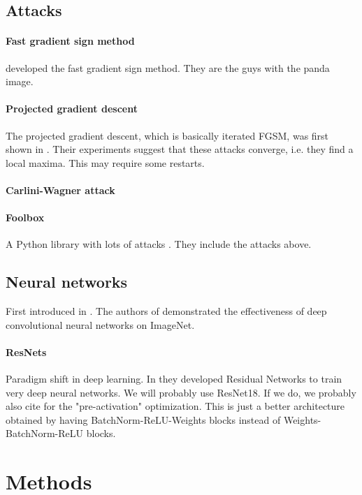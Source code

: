 \documentclass{article}
\begin{document}
\subsection{Attacks}

\paragraph{Fast gradient sign method}
\cite{goodfellow2014explaining} developed the fast gradient sign method. They are the guys with the panda image.

\paragraph{Projected gradient descent}
The projected gradient descent, which is basically iterated FGSM, was first shown in \cite{madry2017towards}. Their experiments suggest that these attacks converge, i.e. they find a local maxima. This may require some restarts.

\paragraph{Carlini-Wagner attack}


\paragraph{Foolbox}
A Python library with lots of attacks \cite{rauber2017foolbox}. They include the attacks above.

\subsection{Neural networks}
First introduced in \cite{lecun1999object}. The authors of
\cite{krizhevsky2012imagenet} demonstrated the effectiveness of deep convolutional neural networks on ImageNet.

\paragraph{ResNets}
Paradigm shift in deep learning. In \cite{he2016deep} they developed Residual Networks to train very deep neural networks. We will probably use ResNet18. If we do, we probably also cite \cite{he2016identity} for the "pre-activation" optimization. This is just a better architecture obtained by having BatchNorm-ReLU-Weights blocks instead of Weights-BatchNorm-ReLU blocks.


\section{Methods}
\end{document}
